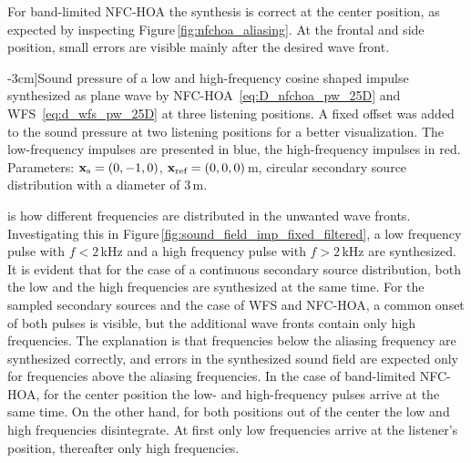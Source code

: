 For band-limited \ac{NFC-HOA} the synthesis is correct at the center position,
as expected by inspecting Figure\,\ref{fig:nfchoa_aliasing}.
At the frontal and side position, small errors are visible mainly after the
desired wave front.

\begin{figure*}[tb]
    \small
    
    \caption[][-3cm]{Sound pressure of a low and high-frequency cosine shaped
    impulse synthesized as plane wave by
    \ac{NFC-HOA}~\protect\eqref{eq:D_nfchoa_pw_25D} and
    \ac{WFS}~\protect\eqref{eq:d_wfs_pw_25D} at three listening positions. A
    fixed offset was added to the sound pressure at two listening positions for
    a better visualization. The low-frequency impulses are presented in blue, the
    high-frequency impulses in red.
    Parameters: $\mathbf{x}_\text{s} = (0,-1,0)$, $\mathbf{x}_\text{ref} = (0,0,0)$\,m, circular secondary
    source distribution with a diameter of $3$\,m.
    }
    \label{fig:sound_field_imp_fixed_filtered}
\end{figure*}
%
 is how different frequencies
are distributed in the unwanted wave fronts. Investigating this in
Figure\,\ref{fig:sound_field_imp_fixed_filtered}, a low frequency pulse with $f <
2$\,kHz and a high frequency pulse with $f > 2$\,kHz are synthesized. It is
evident that for the case of a continuous secondary source distribution,
both the low and the high frequencies are synthesized at the same time. For
the sampled secondary sources and the case of \ac{WFS} and \ac{NFC-HOA}, a common onset of
both pulses is visible, but the additional wave fronts contain only high
frequencies. The explanation is that frequencies below the
aliasing frequency are synthesized correctly, and errors in the synthesized
sound field are expected only for frequencies
above the aliasing frequencies.
In the case of band-limited \ac{NFC-HOA}, for the center position the low- and
high-frequency pulses arrive at the same time. On the other hand,
for both positions out of the
center the low and high frequencies disintegrate. At first only low
frequencies arrive at the listener's position, thereafter only high
frequencies.

